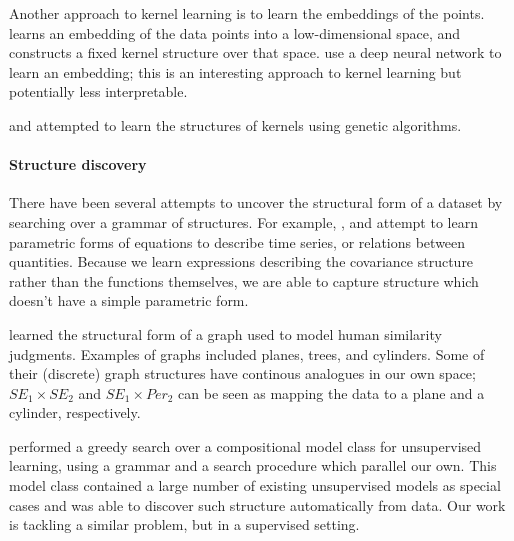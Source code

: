 \documentclass[twoside]{article}
\begin{document}
Another approach to kernel learning is to learn the embeddings of the points. 
\cite{lawrence2005probabilistic} learns an embedding of the data points into a low-dimensional space, and constructs a fixed kernel structure over that space.
\citet{salakhutdinov2008using} use a deep neural network to learn an embedding; this is an interesting approach to kernel learning but potentially less interpretable.

\citet{diosan2007evolving} and \citet{bing2010gp} attempted to learn the structures of kernels using genetic algorithms.  

\paragraph{Structure discovery}

There have been several attempts to uncover the structural form of a dataset by searching over a grammar of structures. For example, \cite{schmidt2009distilling}, \cite{todorovski1997declarative} and \cite{washio1999discovering} attempt to learn parametric forms of equations to describe time series, or relations between quantities. Because we learn expressions describing the covariance structure rather than the functions themselves, we are able to capture structure which doesn't have a simple parametric form.

\citet{kemp2008discovery} learned the structural form of a graph used to model human similarity judgments.
Examples of graphs included planes, trees, and cylinders.
Some of their (discrete) graph structures have continous analogues in our own space; \eg $SE_1 \times SE_2$ and $SE_1 \times Per_2$ can be seen as mapping the data to a plane and a cylinder, respectively.

\citet{grosse2012exploiting} performed a greedy search over a compositional model class for unsupervised learning, using a grammar and a search procedure which parallel our own. This model class contained a large number of existing unsupervised models as special cases and was able to discover such structure automatically from data. Our work is tackling a similar problem, but in a supervised setting.
\end{document}
